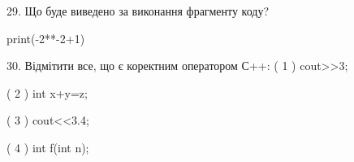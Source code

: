\documentclass[11pt]{article}
\begin{document}
29. Що буде виведено за виконання фрагменту коду?

print(-2**-2+1)

30. Відмітити все, що є коректним оператором С++:
( 1 ) cout>>3;

( 2 ) int x+y=z;

( 3 ) cout<<3.4;

( 4 ) int f(int n);































\newpage
\end{document}
